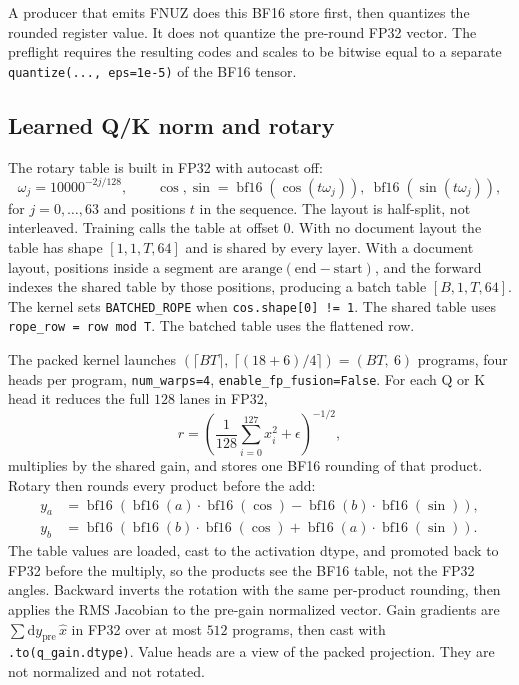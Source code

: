 \documentclass[11pt]{article}
\DeclareRobustCommand{\code}[1]{\texttt{#1}}
\newcommand{\bfsixteen}{\operatorname{bf16}}
\begin{document}
A producer that emits FNUZ does this BF16 store first, then quantizes the
rounded register value. It does not quantize the pre-round FP32 vector. The
preflight requires the resulting codes and scales to be bitwise equal to a
separate \code{quantize(..., eps=1e-5)} of the BF16 tensor.

\subsection{Learned Q/K norm and rotary}

The rotary table is built in FP32 with autocast off:
\begin{equation}
\omega_j = 10000^{-2j/128},\qquad
\cos,\sin = \bfsixteen(\cos(t\omega_j)),\ \bfsixteen(\sin(t\omega_j)),
\end{equation}
for \(j=0,\ldots,63\) and positions \(t\) in the sequence. The layout is
half-split, not interleaved. Training calls the table at offset \(0\). With
no document layout the table has shape \([1,1,T,64]\) and is shared by every
layer. With a document layout, positions inside a segment are
\(\mathrm{arange}(\mathrm{end}-\mathrm{start})\), and the forward indexes the
shared table by those positions, producing a batch table
\([B,1,T,64]\). The kernel sets \code{BATCHED\_ROPE} when
\code{cos.shape[0] != 1}. The shared table uses
\code{rope\_row = row mod T}. The batched table uses the flattened row.

The packed kernel launches
\((\lceil B T\rceil,\ \lceil (18+6)/4\rceil)=(BT,\ 6)\) programs,
four heads per program, \code{num\_warps=4},
\code{enable\_fp\_fusion=False}. For each Q or K head it reduces the full
\(128\) lanes in FP32,
\begin{equation}
r = \left(\frac{1}{128}\sum_{i=0}^{127} x_i^{2}+\epsilon\right)^{-1/2},
\end{equation}
multiplies by the shared gain, and stores one BF16 rounding of that product.
Rotary then rounds every product before the add:
\begin{align*}
y_a &= \bfsixteen(\bfsixteen(a)\cdot\bfsixteen(\cos)
                 - \bfsixteen(b)\cdot\bfsixteen(\sin)),\\
y_b &= \bfsixteen(\bfsixteen(b)\cdot\bfsixteen(\cos)
                 + \bfsixteen(a)\cdot\bfsixteen(\sin)).
\end{align*}
The table values are loaded, cast to the activation dtype, and promoted back
to FP32 before the multiply, so the products see the BF16 table, not the
FP32 angles. Backward inverts the rotation with the same per-product
rounding, then applies the RMS Jacobian to the pre-gain normalized vector.
Gain gradients are \(\sum \mathrm{d}y_{\mathrm{pre}}\,\hat{x}\) in FP32 over
at most \(512\) programs, then cast with \code{.to(q\_gain.dtype)}. Value
heads are a view of the packed projection. They are not normalized and not
rotated.
\end{document}
